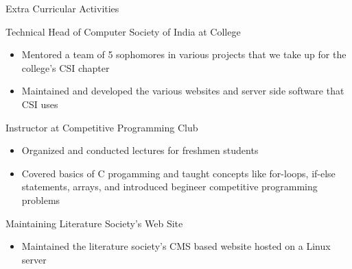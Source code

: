 \documentclass{article}
\newlength{\tabin}
\newlength{\secsep}
\newcommand{\lineunder}{\vspace*{-8pt} \\ \hspace*{-6pt} \hrulefill \\ \vspace*{-15pt}}
\newenvironment{tabbedsection}[1]{
	\begin{list}{}{
		\setlength{\itemsep}{0pt}
		\setlength{\labelsep}{0pt}
		\setlength{\labelwidth}{0pt}
		\setlength{\leftmargin}{\tabin}
		\setlength{\rightmargin}{\tabin}
		\setlength{\listparindent}{0pt}
		\setlength{\parsep}{0pt}
		\setlength{\parskip}{0pt}
		\setlength{\partopsep}{0pt}
		\setlength{\topsep}{#1}
	}
	\item[]
}{\end{list}}
\newenvironment{resume_section}[1]{
	\filbreak
	\vspace{2\secsep}
	\textsc{\large#1}
	\lineunder
	\begin{tabbedsection}{\secsep}
}{\end{tabbedsection}}
\newenvironment{resume_subsection}[2][]{
	\textbf{#2} \hfill {\footnotesize #1} \hspace{2em}
	\begin{tabbedsection}{0.5\secsep}
}{\end{tabbedsection}}
\newenvironment{subitems}{
	\renewcommand{\labelitemi}{-}
	\begin{itemize}
		\setlength{\labelsep}{1em}
}{\end{itemize}}
\begin{document}
\begin{resume_section}{Extra Curricular Activities}

	\begin{resume_subsection}{Technical Head of Computer Society of India at College}
		\begin{subitems}
			\item Mentored a team of 5 sophomores in various
				projects that we take up for the college's CSI
				chapter
			\item Maintained and developed the various websites and server
				side software that CSI uses
		\end{subitems}
	\end{resume_subsection}

	\begin{resume_subsection}{Instructor at Competitive Programming Club}
		\begin{subitems}
			\item   Organized and conducted lectures for freshmen students
			\item   Covered basics of C progamming and taught
				concepts like for-loops, if-else statements,
				arrays, and introduced begineer competitive
				programming problems
		\end{subitems}
	\end{resume_subsection}

	\begin{resume_subsection}{Maintaining Literature Society's Web Site}
		\begin{subitems}
			\item   Maintained the literature society's
				CMS based website hosted on a Linux server
		\end{subitems}
	\end{resume_subsection}

\end{resume_section}
\end{document}
